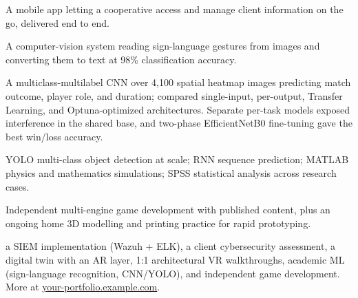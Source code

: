 \documentclass[10pt,a4paper]{article}
\newcommand{\cvmoreprojects}[1]{\needspace{2\baselineskip}\vspace{2pt}{\bfseries Also built:} #1\par}
\newcommand{\cvproject}[3]{\needspace{4\baselineskip}\vspace{2pt}{\bfseries #1}\par\vspace{-4pt}{\itshape\small Tech stack: #2\par}\vspace{-4pt}#3\par}
\begin{document}
\cvproject{Mobile Client-Management App}{React Native · Firebase}{A mobile app letting a cooperative access and manage client information on the go, delivered end to end.}

\cvproject{Sign Language Recognition: Image-to-Text (Academic)}{Python · Computer vision · ML}{A computer-vision system reading sign-language gestures from images and converting them to text at 98\% classification accuracy.}

\cvproject{CNN Match Classification (Academic)}{Python · CNNs · Transfer Learning · EfficientNetB0 · Optuna}{A multiclass-multilabel CNN over 4,100 spatial heatmap images predicting match outcome, player role, and duration; compared single-input, per-output, Transfer Learning, and Optuna-optimized architectures. Separate per-task models exposed interference in the shared base, and two-phase EfficientNetB0 fine-tuning gave the best win/loss accuracy.}

\cvproject{Further Academic ML \& Computing}{Python · YOLO · RNNs · MATLAB · SPSS}{YOLO multi-class object detection at scale; RNN sequence prediction; MATLAB physics and mathematics simulations; SPSS statistical analysis across research cases.}

\cvproject{Game Design \& Development and Maker Practice}{Unity · Godot · Blender · VRChat SDK · FDM printing}{Independent multi-engine game development with published content, plus an ongoing home 3D modelling and printing practice for rapid prototyping.}

\cvmoreprojects{a SIEM implementation (Wazuh + ELK), a client cybersecurity assessment, a digital twin with an AR layer, 1:1 architectural VR walkthroughs, academic ML (sign-language recognition, CNN/YOLO), and independent game development. More at \href{https://your-portfolio.example.com}{your-portfolio.example.com}.}

\end{document}
